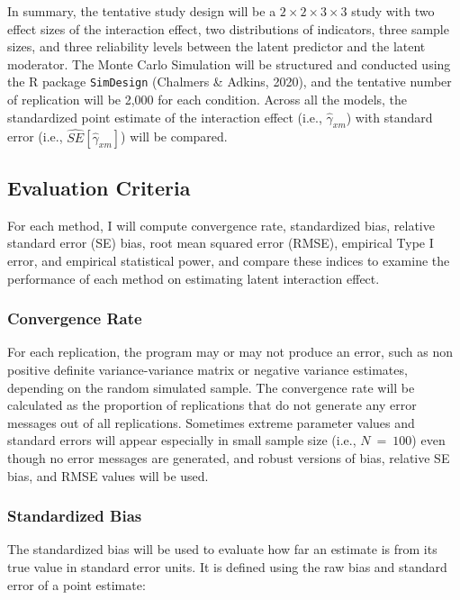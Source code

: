 \documentclass[
  man]{apa6}
\begin{document}
In summary, the tentative study design will be a \(2 \times 2 \times 3 \times 3\) study with two effect sizes of the interaction effect, two distributions of indicators, three sample sizes, and three reliability levels between the latent predictor and the latent moderator. The Monte Carlo Simulation will be structured and conducted using the R package \texttt{SimDesign} (Chalmers \& Adkins, 2020), and the tentative number of replication will be 2,000 for each condition. Across all the models, the standardized point estimate of the interaction effect (i.e., \(\hat{\gamma}_{xm}\)) with standard error (i.e., \(\hat{SE}[\hat{\gamma}_{xm}]\)) will be compared.

\hypertarget{evaluation-criteria}{%
\subsection{Evaluation Criteria}\label{evaluation-criteria}}

For each method, I will compute convergence rate, standardized bias, relative standard error (SE) bias, root mean squared error (RMSE), empirical Type I error, and empirical statistical power, and compare these indices to examine the performance of each method on estimating latent interaction effect.

\hypertarget{convergence-rate}{%
\subsubsection{Convergence Rate}\label{convergence-rate}}

For each replication, the program may or may not produce an error, such as non positive definite variance-variance matrix or negative variance estimates, depending on the random simulated sample. The convergence rate will be calculated as the proportion of replications that do not generate any error messages out of all replications.
Sometimes extreme parameter values and standard errors will appear especially in small sample size (i.e., \(N \ = \ 100\)) even though no error messages are generated, and robust versions of bias, relative SE bias, and RMSE values will be used.

\hypertarget{standardized-bias}{%
\subsubsection{Standardized Bias}\label{standardized-bias}}

The standardized bias will be used to evaluate how far an estimate is from its true value in standard error units. It is defined using the raw bias and standard error of a point estimate:
\end{document}

